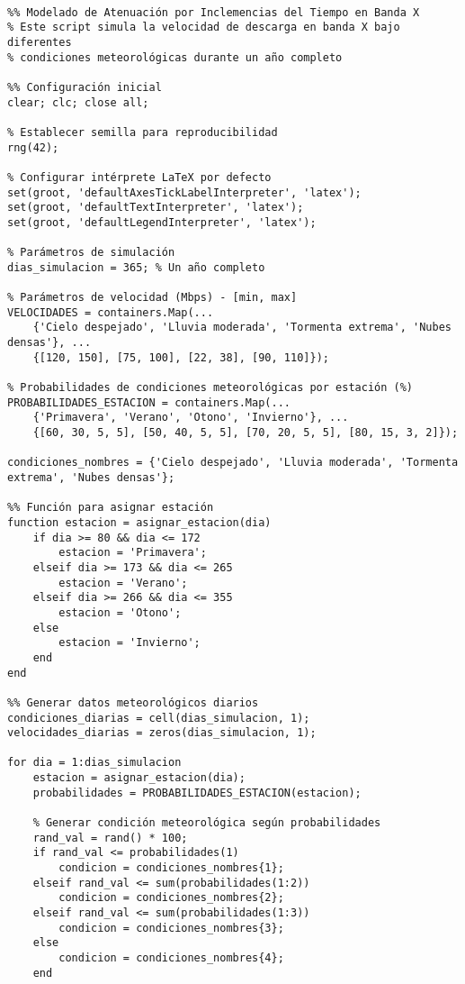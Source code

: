\begin{verbatim}

%% Modelado de Atenuación por Inclemencias del Tiempo en Banda X
% Este script simula la velocidad de descarga en banda X bajo diferentes
% condiciones meteorológicas durante un año completo

%% Configuración inicial
clear; clc; close all;

% Establecer semilla para reproducibilidad
rng(42);

% Configurar intérprete LaTeX por defecto
set(groot, 'defaultAxesTickLabelInterpreter', 'latex');
set(groot, 'defaultTextInterpreter', 'latex');
set(groot, 'defaultLegendInterpreter', 'latex');

% Parámetros de simulación
dias_simulacion = 365; % Un año completo

% Parámetros de velocidad (Mbps) - [min, max]
VELOCIDADES = containers.Map(...
    {'Cielo despejado', 'Lluvia moderada', 'Tormenta extrema', 'Nubes densas'}, ...
    {[120, 150], [75, 100], [22, 38], [90, 110]});

% Probabilidades de condiciones meteorológicas por estación (%)
PROBABILIDADES_ESTACION = containers.Map(...
    {'Primavera', 'Verano', 'Otono', 'Invierno'}, ...
    {[60, 30, 5, 5], [50, 40, 5, 5], [70, 20, 5, 5], [80, 15, 3, 2]});

condiciones_nombres = {'Cielo despejado', 'Lluvia moderada', 'Tormenta extrema', 'Nubes densas'};

%% Función para asignar estación
function estacion = asignar_estacion(dia)
    if dia >= 80 && dia <= 172
        estacion = 'Primavera';
    elseif dia >= 173 && dia <= 265
        estacion = 'Verano';
    elseif dia >= 266 && dia <= 355
        estacion = 'Otono';
    else
        estacion = 'Invierno';
    end
end

%% Generar datos meteorológicos diarios
condiciones_diarias = cell(dias_simulacion, 1);
velocidades_diarias = zeros(dias_simulacion, 1);

for dia = 1:dias_simulacion
    estacion = asignar_estacion(dia);
    probabilidades = PROBABILIDADES_ESTACION(estacion);
    
    % Generar condición meteorológica según probabilidades
    rand_val = rand() * 100;
    if rand_val <= probabilidades(1)
        condicion = condiciones_nombres{1};
    elseif rand_val <= sum(probabilidades(1:2))
        condicion = condiciones_nombres{2};
    elseif rand_val <= sum(probabilidades(1:3))
        condicion = condiciones_nombres{3};
    else
        condicion = condiciones_nombres{4};
    end
    

\end{verbatim}
